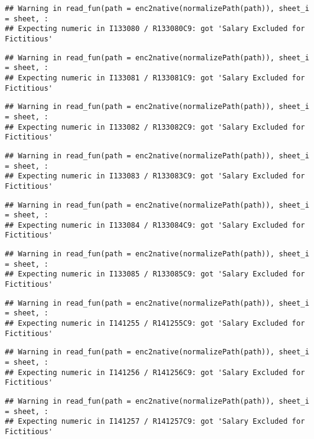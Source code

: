 \documentclass[
]{article}
\begin{document}
\begin{verbatim}
## Warning in read_fun(path = enc2native(normalizePath(path)), sheet_i = sheet, :
## Expecting numeric in I133080 / R133080C9: got 'Salary Excluded for Fictitious'
\end{verbatim}

\begin{verbatim}
## Warning in read_fun(path = enc2native(normalizePath(path)), sheet_i = sheet, :
## Expecting numeric in I133081 / R133081C9: got 'Salary Excluded for Fictitious'
\end{verbatim}

\begin{verbatim}
## Warning in read_fun(path = enc2native(normalizePath(path)), sheet_i = sheet, :
## Expecting numeric in I133082 / R133082C9: got 'Salary Excluded for Fictitious'
\end{verbatim}

\begin{verbatim}
## Warning in read_fun(path = enc2native(normalizePath(path)), sheet_i = sheet, :
## Expecting numeric in I133083 / R133083C9: got 'Salary Excluded for Fictitious'
\end{verbatim}

\begin{verbatim}
## Warning in read_fun(path = enc2native(normalizePath(path)), sheet_i = sheet, :
## Expecting numeric in I133084 / R133084C9: got 'Salary Excluded for Fictitious'
\end{verbatim}

\begin{verbatim}
## Warning in read_fun(path = enc2native(normalizePath(path)), sheet_i = sheet, :
## Expecting numeric in I133085 / R133085C9: got 'Salary Excluded for Fictitious'
\end{verbatim}

\begin{verbatim}
## Warning in read_fun(path = enc2native(normalizePath(path)), sheet_i = sheet, :
## Expecting numeric in I141255 / R141255C9: got 'Salary Excluded for Fictitious'
\end{verbatim}

\begin{verbatim}
## Warning in read_fun(path = enc2native(normalizePath(path)), sheet_i = sheet, :
## Expecting numeric in I141256 / R141256C9: got 'Salary Excluded for Fictitious'
\end{verbatim}

\begin{verbatim}
## Warning in read_fun(path = enc2native(normalizePath(path)), sheet_i = sheet, :
## Expecting numeric in I141257 / R141257C9: got 'Salary Excluded for Fictitious'
\end{verbatim}
\end{document}
